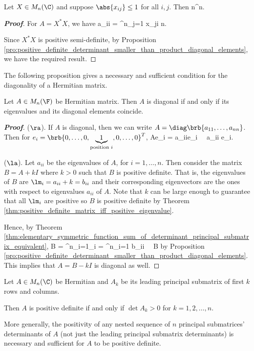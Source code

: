 \begin{corollary}\label{cor:positive_definite_determinant_smaller_than_n_power_n}
Let $X\in M_n(\C)$ and suppose $\abs{x_{ij}}\leq 1$ for all $i,j$. Then
\be
\det{} \leq n^n.
\ee
\end{corollary}

\begin{proof}[\bf Proof]
For $A = X^*X$, we have
\be
a_{ii} = \sum^n_{j=1}  x_{ji} \leq n.
\ee

Since $X^*X$ is positive semi-definite, by Proposition \ref{pro:positive_definite_determinant_smaller_than_product_diagonal_elements}, we have the required result.
\end{proof}

The following proposition gives a necessary and sufficient condition for the diagonality of a Hermitian matrix.

\begin{proposition}
Let $A\in M_n(\F)$ be Hermitian matrix. Then $A$ is diagonal if and only if its eigenvalues and its diagonal elements coincide.
\end{proposition}

\begin{proof}[\bf Proof]
($\ra$). If $A$ is diagonal, then we can write $A=\diag\brb{a_{11},\dots,a_{nn}}$. Then for $e_i = \brb{0,\dots,0,\underbrace{1}_{\text{position }i},0,\dots,0}^T$,
\be
Ae_i = a_{ii}e_i \ \ra\ a_{ii} e_i.
\ee

($\la$). Let $a_{ii}$ be the eigenvalues of $A$, for $i=1,\dots,n$. Then consider the matrix $B = A + kI$ where $k>0$ such that $B$ is positive definite. That is, the eigenvalues of $B$ are $\lm_i = a_{ii}+k = b_{ii}$ and their corresponding eigenvectors are the ones with respect to eigenvalues $a_{ii}$ of $A$. Note that $k$ can be large enough to guarantee that all $\lm_i$ are positive so $B$ is positive definite by Theorem \ref{thm:positive_definite_matrix_iff_positive_eigenvalue}.

Hence, by Theorem \ref{thm:elementary_symmetric_function_sum_of_determinant_principal_submatrix_equivalent},
\be
\det B = \prod^n_{i=1}\lm_i = \prod^n_{i=1} b_{ii} \ \ra\ B
\ee
by Proposition \ref{pro:positive_definite_determinant_smaller_than_product_diagonal_elements}. This implies that $A = B- kI$ is diagonal as well.
\end{proof}



\begin{theorem}\label{thm:positive_definite_iff_leading_principal_submatrices_determinants}
Let $A\in M_n(\C)$ be Hermitian and $A_k$ be its leading principal submatrix of first $k$ rows and columns.

Then $A$ is positive definite if and only if $\det A_k > 0$ for $k=1,2,\dots,n$.

More generally, the positivity of any nested sequence of $n$ principal submatrices' determinants of $A$ (not just the leading principal submatrix determinants) is necessary and sufficient for $A$ to be positive definite.
\end{theorem}

